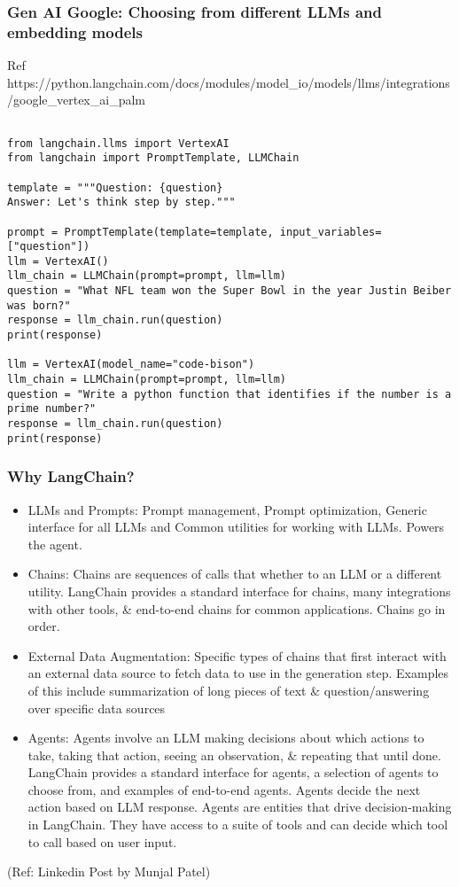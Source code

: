 \begin{frame}[fragile]\frametitle{Gen AI Google: Choosing from different LLMs and embedding models}

Ref https://python.langchain.com/docs/modules/model\_io/models/llms/integrations/google\_vertex\_ai\_palm

\begin{lstlisting}

from langchain.llms import VertexAI
from langchain import PromptTemplate, LLMChain

template = """Question: {question}
Answer: Let's think step by step."""

prompt = PromptTemplate(template=template, input_variables=["question"])
llm = VertexAI()
llm_chain = LLMChain(prompt=prompt, llm=llm)
question = "What NFL team won the Super Bowl in the year Justin Beiber was born?"
response = llm_chain.run(question)
print(response)

llm = VertexAI(model_name="code-bison")
llm_chain = LLMChain(prompt=prompt, llm=llm)
question = "Write a python function that identifies if the number is a prime number?"
response = llm_chain.run(question)
print(response)
\end{lstlisting}


\end{frame}




\begin{frame}\frametitle{Why LangChain?}

\begin{itemize}
\item LLMs and Prompts: Prompt management, Prompt optimization, Generic interface for all LLMs and Common utilities for working with LLMs. Powers the agent.
\item Chains: Chains are sequences of calls that whether to an LLM or a different utility. LangChain provides a standard interface for chains, many integrations with other tools, \& end-to-end chains for common applications. Chains go in order.
\item External Data Augmentation: Specific types of chains that first interact with an external data source to fetch data to use in the generation step. Examples of this include summarization of long pieces of text \& question/answering over specific data sources
\item Agents: Agents involve an LLM making decisions about which actions to take, taking that action, seeing an observation, \& repeating that until done. LangChain provides a standard interface for agents, a selection of agents to choose from, and examples of end-to-end agents. Agents decide the next action based on LLM response. Agents are entities that drive decision-making in LangChain. They have access to a suite of tools and can decide which tool to call based on user input. 
\end{itemize}

{\tiny (Ref: Linkedin Post by Munjal Patel)}
\end{frame}


